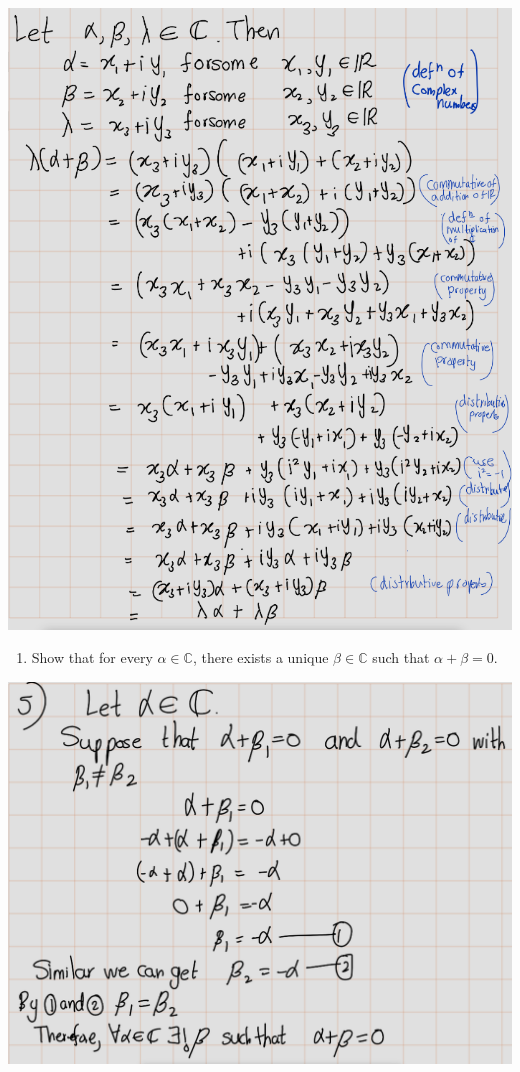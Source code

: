 \documentclass[
]{book}
\providecommand{\tightlist}{%
  \setlength{\itemsep}{0pt}\setlength{\parskip}{0pt}}
\theoremstyle{definition}
\theoremstyle{definition}
\theoremstyle{definition}
\theoremstyle{definition}
\theoremstyle{remark}
\begin{document}
\includegraphics{fig/Ex1A/Ex4.png}

\begin{enumerate}
\def\labelenumi{\arabic{enumi}.}
\setcounter{enumi}{4}
\tightlist
\item
  Show that for every \(\alpha \in \mathbb{C}\), there exists a unique \(\beta \in \mathbb{C}\) such that \(\alpha + \beta = 0\).
\end{enumerate}

\includegraphics{fig/Ex1A/Ex5.png}
\end{document}

